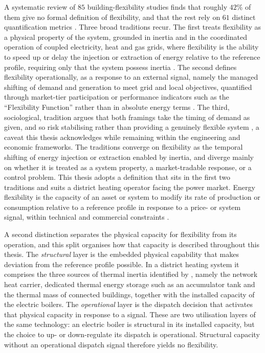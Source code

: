 A systematic review of $85$ building-flexibility studies finds that roughly $42\%$ of them give no formal definition of flexibility, and that the rest rely on $61$ distinct quantification metrics \cite{li_residential_2021}. Three broad traditions recur. The first treats flexibility as a physical property of the system, grounded in inertia and in the coordinated operation of coupled electricity, heat and gas grids, where flexibility is the ability to speed up or delay the injection or extraction of energy relative to the reference profile, requiring only that the system possess inertia \cite{vandermeulen_controlling_2018, lund_smart_2017}.
The second defines flexibility operationally, as a response to an external signal, namely the managed shifting of demand and generation to meet grid and local objectives, quantified through market-tier participation or performance indicators such as the ``Flexibility Function'' rather than in absolute energy terms \cite{li_ten_2022, golmohamadi_integration_2022}. 
The third, sociological, tradition argues that both framings take the timing of demand as given, and so risk stabilising rather than providing a genuinely flexible system \cite{blue_conceptualising_2020}, a caveat this thesis acknowledges while remaining within the engineering and economic frameworks. The traditions converge on flexibility as the temporal shifting of energy injection or extraction enabled by inertia, and diverge mainly on whether it is treated as a system property, a market-tradable response, or a control problem. This thesis adopts a definition that sits in the first two traditions and suits a district heating operator facing the power market. Energy flexibility is the capacity of an asset or system to modify its rate of production or consumption relative to a reference profile in response to a price- or system signal, within technical and commercial constraints \cite{sneum_barriers_2021, degefa_comprehensive_2021}. 

A second distinction separates the physical capacity for flexibility from its operation, and this split organises how that capacity is described throughout this thesis. The \textit{structural} layer is the embedded physical capability that makes deviation from the reference profile possible. In a district heating system it comprises the three sources of thermal inertia identified by \cite{vandermeulen_controlling_2018}, namely the network heat carrier, dedicated thermal energy storage such as an accumulator tank and the thermal mass of connected buildings, together with the installed capacity of the electric boilers. The \textit{operational} layer is the dispatch decision that activates that physical capacity in response to a signal. These are two utilisation layers of the same technology: an electric boiler is structural in its installed capacity, but the choice to up- or down-regulate its dispatch is operational. Structural capacity without an operational dispatch signal therefore yields no flexibility. 

